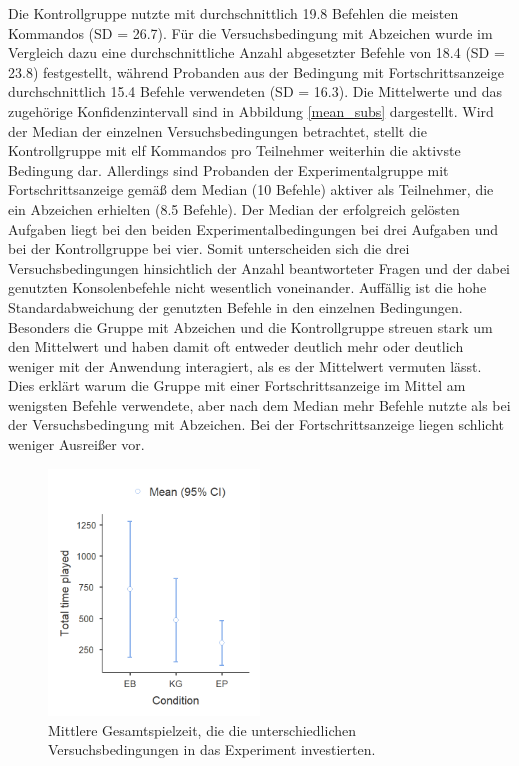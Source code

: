 Die Kontrollgruppe nutzte mit durchschnittlich 19.8 Befehlen die meisten Kommandos (SD = 26.7). Für die Versuchsbedingung mit Abzeichen wurde im Vergleich dazu eine durchschnittliche Anzahl abgesetzter Befehle von 18.4 (SD = 23.8) festgestellt, während Probanden aus der Bedingung mit Fortschrittsanzeige durchschnittlich 15.4 Befehle verwendeten (SD = 16.3). Die Mittelwerte und das zugehörige Konfidenzintervall sind in Abbildung \ref{mean_subs} dargestellt. Wird der Median der einzelnen Versuchsbedingungen betrachtet, stellt die Kontrollgruppe mit elf Kommandos pro Teilnehmer weiterhin die aktivste Bedingung dar. Allerdings sind Probanden der Experimentalgruppe mit Fortschrittsanzeige gemäß dem Median (10 Befehle) aktiver als Teilnehmer, die ein Abzeichen erhielten (8.5 Befehle). Der Median der erfolgreich gelösten Aufgaben liegt bei den beiden Experimentalbedingungen bei drei Aufgaben und bei der Kontrollgruppe bei vier. Somit unterscheiden sich die drei Versuchsbedingungen hinsichtlich der Anzahl beantworteter Fragen und der dabei genutzten Konsolenbefehle nicht wesentlich voneinander. Auffällig ist die hohe Standardabweichung der genutzten Befehle in den einzelnen Bedingungen. Besonders die Gruppe mit Abzeichen und die Kontrollgruppe streuen stark um den Mittelwert und haben damit oft entweder deutlich mehr oder deutlich weniger mit der Anwendung interagiert, als es der Mittelwert vermuten lässt. Dies erklärt warum die Gruppe mit einer Fortschrittsanzeige im Mittel am wenigsten Befehle verwendete, aber nach dem Median mehr Befehle nutzte als bei der Versuchsbedingung mit Abzeichen. Bei der Fortschrittsanzeige liegen schlicht weniger Ausreißer vor.  

\begin{figure}[htbp]
    \centering
    \includegraphics[width=0.5\textwidth]{img/auswertung/mean_time.png}
    \caption{Mittlere Gesamtspielzeit, die die unterschiedlichen Versuchsbedingungen in das Experiment investierten.}
    \label{mean_time}
\end{figure}

